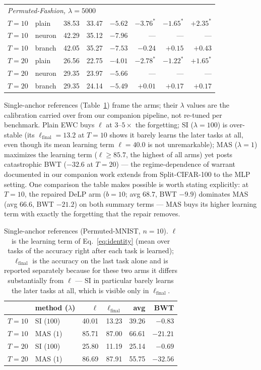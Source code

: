 \documentclass[10pt]{article}
\begin{document}
\begin{table}[t]
\begin{tabular}{llrrrr rr}
\midrule
\multicolumn{8}{l}{\emph{Permuted-Fashion, $\lambda{=}5000$}}\\
$T{=}10$ & plain  & 38.53 & 33.47 & $-5.62$ & $-3.76^{*}$ & $-1.65^{*}$ & $+2.35^{*}$ \\
$T{=}10$ & neuron & 42.29 & 35.12 & $-7.96$ & --- & --- & --- \\
$T{=}10$ & branch & 42.05 & 35.27 & $-7.53$ & $-0.24$ & $+0.15$ & $+0.43$ \\
$T{=}20$ & plain  & 26.56 & 22.75 & $-4.01$ & $-2.78^{*}$ & $-1.22^{*}$ & $+1.65^{*}$ \\
$T{=}20$ & neuron & 29.35 & 23.97 & $-5.66$ & --- & --- & --- \\
$T{=}20$ & branch & 29.35 & 24.14 & $-5.49$ & $+0.01$ & $+0.17$ & $+0.17$ \\
\bottomrule
\end{tabular}
\end{table}

Single-anchor references (Table~\ref{tab:refs}) frame the arms; their
$\lambda$ values are the calibration carried over from our companion
pipeline, not re-tuned per benchmark. Plain EWC buys $\ell$ at
$3$--$5\times$ the forgetting; SI ($\lambda{=}100$) is over-stable (its
$\ell_{\mathrm{final}}{=}13.2$ at $T{=}10$ shows it barely learns the later
tasks at all, even though its mean learning term $\ell{=}40.0$ is not
unremarkable); MAS ($\lambda{=}1$) maximizes the learning term
($\ell \ge 85.7$, the highest of all arms) yet posts catastrophic BWT
($-32.6$ at $T{=}20$) --- the regime-dependence of warrant documented
in our companion work extends from Split-CIFAR-100 to the MLP setting. One
comparison the table makes possible is worth stating explicitly: at
$T{=}10$, the repaired \mbox{DeLP} arm ($b{=}10$; avg $68.7$, BWT $-9.9$)
dominates MAS (avg $66.6$, BWT $-21.2$) on both summary terms --- MAS
buys its higher learning term with exactly the forgetting that the repair
removes.

\begin{table}[t]
\centering\small
\caption{Single-anchor references (Permuted-MNIST, $n{=}10$). $\ell$ is the
learning term of Eq.~\eqref{eq:identity} (mean over tasks of the accuracy
right after each task is learned); $\ell_{\mathrm{final}}$ is the accuracy on
the last task alone and is reported separately because for these two arms it
differs substantially from $\ell$ --- SI in particular barely learns the later
tasks at all, which is visible only in $\ell_{\mathrm{final}}$.}
\label{tab:refs}
\begin{tabular}{llrrrr}
\toprule
 & method ($\lambda$) & $\ell$ & $\ell_{\mathrm{final}}$ & avg & BWT \\
\midrule
$T{=}10$ & SI ($100$) & 40.01 & 13.23 & 39.26 & $-0.83$ \\
$T{=}10$ & MAS ($1$)   & 85.71 & 87.00 & 66.61 & $-21.21$ \\
$T{=}20$ & SI ($100$) & 25.80 & 11.19 & 25.14 & $-0.69$ \\
$T{=}20$ & MAS ($1$)   & 86.69 & 87.91 & 55.75 & $-32.56$ \\
\bottomrule
\end{tabular}
\end{table}
\end{document}
